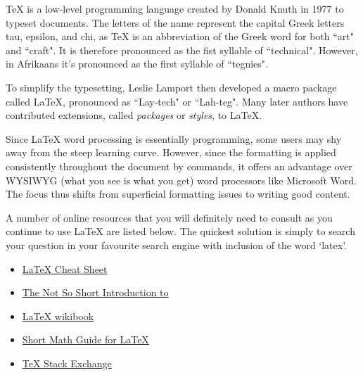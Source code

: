 \TeX{} is a low-level programming language created by Donald Knuth in 1977 to typeset documents. The letters of the name represent the
capital Greek letters tau, epsilon, and chi, as \TeX{} is an abbreviation of the Greek word for both ``art" and ``craft". It is therefore pronounced as the fist syllable of ``technical". However, in Afrikaans it's pronounced as the first syllable of ``tegnies".

To simplify the typesetting, Leslie Lamport then developed a macro package called \LaTeX{}, pronounced as ``Lay-tech" or ``Lah-teg". Many later authors have contributed extensions, called \textit{packages} or \textit{styles}, to \LaTeX{}.

Since \LaTeX{} word processing is essentially programming, some users may shy away from the steep learning curve. However, since the formatting is applied consistently throughout the document by commands, it offers an advantage over WYSIWYG (what you see is what you get) word processors like Microsoft Word. The focus thus shifts from superficial formatting issues to writing good content.

A number of online resources that you will definitely need to consult as you continue to use \LaTeX{} are listed below.
The quickest solution is simply to search your question in your favourite search engine with inclusion of the word `latex'.

\begin{itemize}
    \item \href{https://wch.github.io/latexsheet/}{\LaTeX{} Cheat Sheet}
    \item \href{https://tobi.oetiker.ch/lshort/lshort.pdf}{The Not So Short Introduction to \LaTeXe}
    \item \href{https://en.m.wikibooks.org/wiki/LaTeX}{\LaTeX{} wikibook}
    \item \href{http://ftp.leg.uct.ac.za/pub/packages/ctan/info/short-math-guide/short-math-guide.pdf}{Short Math Guide for \LaTeX}
    \item \href{http://tex.stackexchange.com}{\TeX{} Stack Exchange}
\end{itemize}